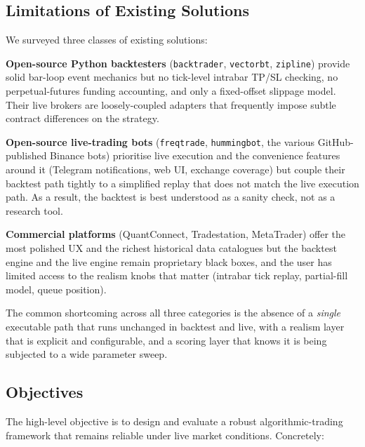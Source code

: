\documentclass[a4paper, 12pt, titlepage]{article}
\begin{document}
\subsection{Limitations of Existing Solutions}

We surveyed three classes of existing solutions:

\textbf{Open-source Python backtesters} (\texttt{backtrader},
\texttt{vectorbt}, \texttt{zipline}) provide solid bar-loop event
mechanics but no tick-level intrabar TP/SL checking, no perpetual-futures
funding accounting, and only a fixed-offset slippage model. Their live
brokers are loosely-coupled adapters that frequently impose subtle
contract differences on the strategy.

\textbf{Open-source live-trading bots} (\texttt{freqtrade},
\texttt{hummingbot}, the various GitHub-published Binance bots)
prioritise live execution and the convenience features around it
(Telegram notifications, web UI, exchange coverage) but couple their
backtest path tightly to a simplified replay that does not match the
live execution path. As a result, the backtest is best understood as
a sanity check, not as a research tool.

\textbf{Commercial platforms} (QuantConnect, Tradestation,
MetaTrader) offer the most polished UX and the richest historical data
catalogues but the backtest engine and the live engine remain
proprietary black boxes, and the user has limited access to the
realism knobs that matter (intrabar tick replay, partial-fill model,
queue position).

The common shortcoming across all three categories is the absence of
a \emph{single} executable path that runs unchanged in backtest and
live, with a realism layer that is explicit and configurable, and a
scoring layer that knows it is being subjected to a wide parameter
sweep.

\subsection{Objectives}

The high-level objective is to design and evaluate a robust
algorithmic-trading framework that remains reliable under live market
conditions. Concretely:
\end{document}
